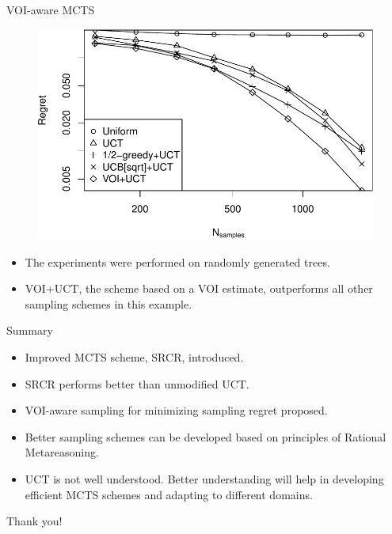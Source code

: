 \documentclass{beamer}
\begin{document}
\begin{frame}{VOI-aware MCTS}
\begin{figure}[h]
  \centering
  \includegraphics[scale=0.6]{tree-identity-k=32-uqb=8+voi.pdf}\\
\end{figure}
\begin{itemize}
\item The experiments were performed on
randomly generated trees.
\item VOI+UCT, the scheme based on a VOI estimate,
outperforms all other sampling schemes in this example.
\end{itemize}
\end{frame}

\begin{frame}{Summary}
\begin{itemize}
\item<+-> Improved MCTS scheme, SRCR, introduced.
\item<+-> SRCR performs better than unmodified UCT.
\item<+-> VOI-aware sampling for minimizing sampling regret proposed.
\item<+-> Better sampling schemes can be developed based on principles
  of Rational Metareasoning.
\item<+-> UCT is not well understood. Better understanding will help
  in developing efficient  MCTS schemes and adapting to different domains.
\end{itemize}
\end{frame}

\begin{frame}{}
\begin{center}
\LARGE{Thank you!}
\end{center}
\end{frame}
\end{document}
